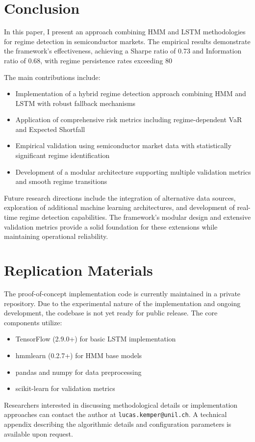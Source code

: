 \section{Conclusion}
In this paper, I present an approach combining HMM \citep{hamilton1989new} and LSTM \citep{hochreiter1997long} methodologies for regime detection in semiconductor markets. The empirical results demonstrate the framework's effectiveness, achieving a Sharpe ratio of 0.73 and Information ratio of 0.68, with regime persistence rates exceeding 80%

The main contributions include:
\begin{itemize}
    \item Implementation of a hybrid regime detection approach combining HMM and LSTM with robust fallback mechanisms \citep{fischer2018deep}
    \item Application of comprehensive risk metrics including regime-dependent VaR and Expected Shortfall \citep{mcneil2000estimation}
    \item Empirical validation using semiconductor market data with statistically significant regime identification \citep{ang2002regime}
    \item Development of a modular architecture supporting multiple validation metrics and smooth regime transitions \citep{mcneil2015quantitative}
\end{itemize}

Future research directions include the integration of alternative data sources, exploration of additional machine learning architectures, and development of real-time regime detection capabilities. The framework's modular design and extensive validation metrics provide a solid foundation for these extensions while maintaining operational reliability.

\section*{Replication Materials}
The proof-of-concept implementation code is currently maintained in a private repository. Due to the experimental nature of the implementation and ongoing development, the codebase is not yet ready for public release. The core components utilize:

\begin{itemize}
    \item TensorFlow (2.9.0+) for basic LSTM implementation
    \item hmmlearn (0.2.7+) for HMM base models
    \item pandas and numpy for data preprocessing
    \item scikit-learn for validation metrics
\end{itemize}

Researchers interested in discussing methodological details or implementation approaches can contact the author at \texttt{lucas.kemper@unil.ch}. A technical appendix describing the algorithmic details and configuration parameters is available upon request.

